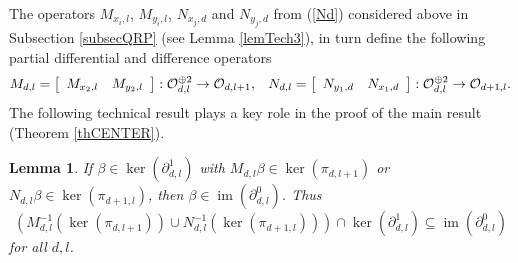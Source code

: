 \documentclass[12pt,reqno]{amsart}%
\theoremstyle{plain}
\newtheorem{lemma}{Lemma}
\numberwithin{theorem}{section} \numberwithin{equation}{section}
\numberwithin{lemma}{section}
\numberwithin{remark}{section}
\numberwithin{example}{section}
\numberwithin{proposition}{section}
\numberwithin{definition}{section}
\numberwithin{corollary}{section}
\begin{document}
The operators $M_{x_{i},l}$, $M_{y_{i},l}$, $N_{x_{j},d}$ and $N_{y_{j},d}$
from (\ref{Nd}) considered above in Subsection \ref{subsecQRP} (see Lemma
\ref{lemTech3}), in turn define the following partial differential and
difference operators
\[
M_{d,l}=\left[
\begin{array}
[c]{cc}%
M_{x_{2},l} & M_{y_{2},l}%
\end{array}
\right]  :\mathcal{O}_{d,l}^{\oplus2}\rightarrow\mathcal{O}_{d,l+1}%
\text{,\quad}N_{d,l}=\left[
\begin{array}
[c]{cc}%
N_{y_{1},d} & N_{x_{1},d}%
\end{array}
\right]  :\mathcal{O}_{d,l}^{\oplus2}\rightarrow\mathcal{O}_{d+1,l}.
\]
The following technical result plays a key role in the proof of the main
result (Theorem \ref{thCENTER}).

\begin{lemma}
\label{lemDDkey}If $\beta\in\ker\left(  \partial_{d,l}^{1}\right)  $ with
$M_{d,l}\beta\in\ker\left(  \pi_{d,l+1}\right)  $ or $N_{d,l}\beta\in
\ker\left(  \pi_{d+1,l}\right)  $, then $\beta\in\operatorname{im}\left(
\partial_{d,l}^{0}\right)  $. Thus
\[
\left(  M_{d,l}^{-1}\left(  \ker\left(  \pi_{d,l+1}\right)  \right)  \cup
N_{d,l}^{-1}\left(  \ker\left(  \pi_{d+1,l}\right)  \right)  \right)  \cap
\ker\left(  \partial_{d,l}^{1}\right)  \subseteq\operatorname{im}\left(
\partial_{d,l}^{0}\right)
\]
for all $d,l$.
\end{lemma}
\end{document}
